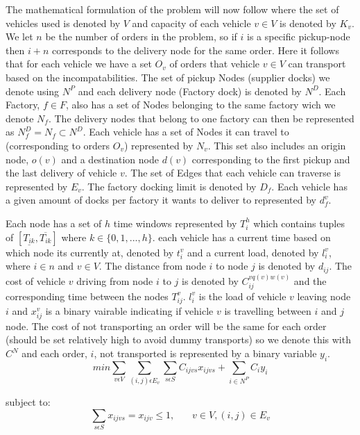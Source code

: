 \documentclass[a4paper,12pt]{article}
\begin{document}
The mathematical formulation of the problem will now follow where the set of vehicles used is denoted by $V$ and capacity of each vehicle $v \in V$ is denoted by $K_v$. We let $n$ be the number of orders in the problem, so if $i$ is a specific pickup-node then $i+n$ corresponds to the delivery node for the same order. Here it follows that for each vehicle we have a set $O_v$ of orders that vehicle $v \in V$ can transport based on the incompatabilities. The set of pickup Nodes (supplier docks) we denote using $N^P$ and each delivery node (Factory dock) is denoted by $N^D$. Each Factory, $f \in F$, also has a set of Nodes belonging to the same factory wich we denote $N_f$. The delivery nodes that belong to one factory can then be represented as $N_f^D = N_f \subset N^D$. Each vehicle has a set of Nodes it can travel to (corresponding to orders $O_v$) represented by $N_v$. This set also includes an origin node, $o(v)$ and a destination node $d(v)$ corresponding to the first pickup and the last delivery of vehicle $v$. The set of Edges that each vehicle can traverse is represented by $E_v$. The factory docking limit is denoted by $D_f$. Each vehicle has a given amount of docks per factory it wants to deliver to represented by $d_{f}^v$. \par 
Each node has a set of $h$ time windows represented by $T_i^h$ which contains tuples of $[ \underline{T_{ik}},  \overline{T_{ik}} ]$ where $k \in \{0,1,...,h\}$. each vehicle has a current time based on which node its currently at, denoted by $t_{i}^v$ and a current load, denoted by $l_{i}^v$, where $i \in n$ and $v \in V$. The distance from node $i$ to node $j$ is denoted by $d_{ij}$. The cost of vehicle $v$ driving from node $i$ to $j$ is denoted by $C_{ij}^{vq(v)w(v)}$ and the corresponding time between the nodes $T_{ij}^v$. $l_{i}^v$ is the load of vehicle $v$ leaving node $i$ and $x_{ij}^v$ is a binary vairable indicating if vehicle $v$ is travelling between $i$ and $j$ node. The cost of not transporting an order will be the same for each order (should be set relatively high to avoid dummy transports) so we denote this with $C^N$ and each order, $i$,  not transported is represented by a binary variable $y_i$. 
\begin{equation}
\label{eq:1}
min\sum_{v\epsilon V} \sum_{(i,j)\epsilon E_v} \sum_{s \epsilon S} C_{ijvs}x_{ijvs} + \sum_{i\in N^P}C_iy_i
\end{equation}

subject to:
\begin{equation} \label{eq:2}
    \sum_{s\epsilon S} x_{ijvs} = x_{ijv} \leq 1, ~~~~~~~~ v \in V, (i, j)\in E_v
\end{equation}
\end{document}
